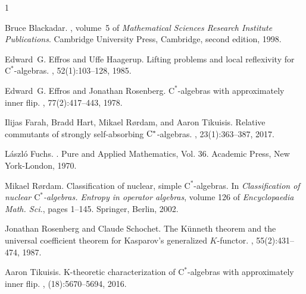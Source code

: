 \documentclass[a4paper,10pt]{amsart}
\newcommand{\cstar}{\ensuremath{\mathrm C^\ast}}
\newcounter{theorem}
\numberwithin{equation}{section}
\numberwithin{theorem}{section}
\begin{document}
\begin{thebibliography}{1}

Bruce Blackadar.
, volume~5 of {\em
  Mathematical Sciences Research Institute Publications}.
\newblock Cambridge University Press, Cambridge, second edition, 1998.

Edward~G. Effros and Uffe Haagerup.
\newblock Lifting problems and local reflexivity for {\cstar}-algebras.
, 52(1):103--128, 1985.

Edward~G. Effros and Jonathan Rosenberg.
\newblock \cstar-algebras with approximately inner flip.
, 77(2):417--443, 1978.

Ilijas Farah, Bradd Hart, Mikael R{\o}rdam, and Aaron Tikuisis.
\newblock Relative commutants of strongly self-absorbing {$\rm C^*$}-algebras.
, 23(1):363--387, 2017.

L{\'a}szl{\'o} Fuchs.
.
\newblock Pure and Applied Mathematics, Vol. 36. Academic Press, New
  York-London, 1970.

Mikael R{\o}rdam.
\newblock Classification of nuclear, simple {\cstar}-algebras.
\newblock In {\em Classification of nuclear {\cstar}-algebras. {E}ntropy in
  operator algebras}, volume 126 of {\em Encyclopaedia Math. Sci.}, pages
  1--145. Springer, Berlin, 2002.

Jonathan Rosenberg and Claude Schochet.
\newblock The {K}\"{u}nneth theorem and the universal coefficient theorem for
  {K}asparov's generalized {$K$}-functor.
, 55(2):431--474, 1987.

Aaron Tikuisis.
\newblock K-theoretic characterization of {\cstar}-algebras with approximately
  inner flip.
, (18):5670--5694, 2016.

\end{thebibliography}
\end{document}
